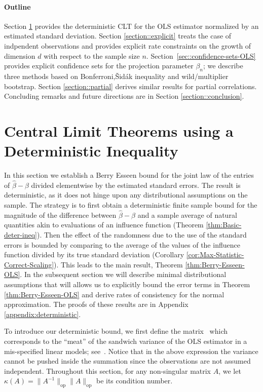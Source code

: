 \documentclass{article}
\let\hat\widehat
\begin{document}
 
 \paragraph{Outline}
 Section \ref{section::determiniswtic}
 provides the deterministic CLT for 
 the OLS estimator normalized by an estimated
 standard deviation.
 Section \ref{section::explicit}
 treats the case of indpendent observations
 and provides explicit rate constraints on
 the growth of dimension $d$ with respect to
 the sample size $n$.
 Section~\ref{sec::confidence-sets-OLS} provides
 explicit confidence sets for the projection 
 parameter $\beta_n$; we describe three methods
 based on Bonferroni,{\v{S}}id{\'a}k inequality
 and wild/multiplier bootstrap.
 Section \ref{section::partial}
 derives similar results for partial correlations.
 Concluding remarks and future directions are in
 Section \ref{section::conclusion}.
 
 \section{Central Limit Theorems using a Deterministic Inequality}
 \label{section::determiniswtic}
 In this section
 we establish a Berry Esseen bound
 for the joint law
 of the entries of $\hat\beta-\beta$ divided elementwise by the estimated
 standard errors.
 The result is deterministic, as it does not hinge upon any distributional  assumptions on the sample.
 The strategy is to first obtain a deterministic finite sample bound
 for the magnitude of the difference between $\hat\beta-\beta$
 and a sample average of natural quantities akin to evaluations of an influence function
 (Theorem \ref{thm:Basic-deter-ineq}).
 Then the effect of the randomness
 due to the use of the standard errors
 is bounded
 by comparing to the average of the values of the influence function
 divided by its true standard deviation
 (Corollary \ref{cor:Max-Statistic-Correct-Scaling}).
 This leads to the main result,
 Theorem \ref{thm:Berry-Esseen-OLS}.
 In the subsequent section we will describe minimal distributional assumptions
 that will allows us to explicitly bound
 the error terms in
 Theorem \ref{thm:Berry-Esseen-OLS} and derive rates of consistency for the normal approximation.
 The proofs of these results are in Appendix \ref{appendix:deterministic}. 
 
 
 To introduce our deterministic bound, we first define the matrix
 \
 which corresponds to the ``meat'' of the sandwich variance of the OLS estimator in a mis-specified linear models; see~\cite{Buja14}.
 Notice that in the above expression the variance cannot be pushed inside the summation since the observations are not assumed independent. Throughout this section, for any non-singular matrix $A$, we let $\kappa(A) = \|A^{-1}\|_{\mathrm{op}}\|A\|_{\mathrm{op}}$ be its condition number.
 
\end{document}
